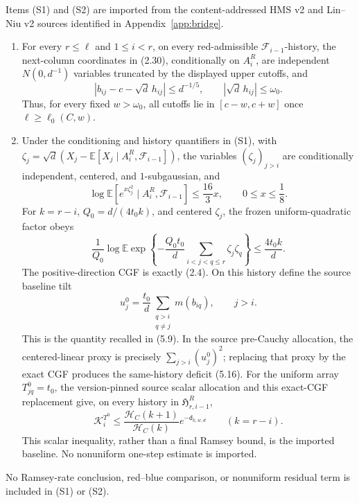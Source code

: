 \begin{assumption}
\label{ass:hms}
Items (S1) and (S2) are imported from the content-addressed HMS v2 and
Lin--Niu v2 sources identified in Appendix~\ref{app:bridge}.
\begin{enumerate}[label=(S\arabic*)]
\item For every \(r\le\ell\) and \(1\le i<r\), on every red-admissible
\(\mathcal F_{i-1}\)-history, the next-column coordinates in (2.30),
conditionally on \(A_i^R\), are independent \(N(0,d^{-1})\) variables
truncated by the displayed upper cutoffs, and
\[
 |b_{ij}-c-\sqrt d\,h_{ij}|\le d^{-1/5},\qquad
 |\sqrt d\,h_{ij}|\le\omega_0.
\tag{2.34}
\]
Thus, for every fixed \(w>\omega_0\), all cutoffs lie in
\([c-w,c+w]\) once \(\ell\ge\ell_0(C,w)\).
\item Under the conditioning and history quantifiers in (S1), with
\(\zeta_j=\sqrt d(X_j-\mathbb E[X_j\mid
A_i^R,\mathcal F_{i-1}])\), the variables \((\zeta_j)_{j>i}\) are
conditionally independent, centered, and \(1\)-subgaussian, and
\[
 \log\mathbb E[e^{x\zeta_j^2}\mid A_i^R,\mathcal F_{i-1}]
 \le\frac{16}{3}x,\qquad 0\le x\le\frac18.
\tag{2.35}
\]
For \(k=r-i\), \(Q_0=d/(4t_0k)\), and centered \(\zeta_j\), the frozen
uniform-quadratic factor obeys
\[
 \frac1{Q_0}\log\mathbb E\exp\!\left\{
 -\frac{Q_0t_0}{d}\sum_{i<j<q\le r}\zeta_j\zeta_q\right\}
 \le\frac{4t_0k}{d}.
\tag{2.36}
\]
The positive-direction CGF is exactly (2.4).  On this history define the
source baseline tilt
\[
 u_j^0=\frac{t_0}{d}\sum_{\substack{q>i\\q\ne j}}m(b_{iq}),
 \qquad j>i.
\]
This is the quantity recalled in (5.9).  In the source pre-Cauchy allocation,
the centered-linear proxy is precisely \(\sum_{j>i}(u_j^0)^2\); replacing
that proxy by the exact CGF produces the same-history deficit (5.16).
For the uniform array \(T^0_{jq}=t_0\), the version-pinned source scalar
allocation and this exact-CGF replacement give, on every history in
\(\mathfrak H^R_{r,i-1}\),
\[
 \mathcal K_i^{T^0}\le
 \frac{\mathcal H_C(k+1)}{\mathcal H_C(k)}
 e^{-\mathsf d_{k,w,d}}
 \qquad(k=r-i).
\tag{2.36a}\label{eq:scalar-baseline}
\]
This scalar inequality, rather than a final Ramsey bound, is the imported
baseline.  No nonuniform one-step estimate is imported.
\end{enumerate}
No Ramsey-rate conclusion, red--blue comparison, or nonuniform residual term
is included in (S1) or (S2).
\end{assumption}

